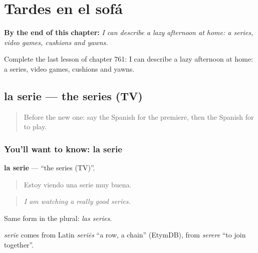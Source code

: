 
\chapter{Tardes en el sofá}
\label{ch:es-tardes-en-el-sofa}

\begin{chapteropening}
\textbf{By the end of this chapter:} \emph{I can describe a lazy afternoon at home: a series, video games, cushions and yawns.}

Complete the last lesson of chapter 761: I can describe a lazy afternoon at home: a series, video games, cushions and yawns.
\end{chapteropening}

\section[la serie]{la serie — the series (TV)}

\label{lesson:ES-C761-serie}



\begin{quote}
Before the new one: say the Spanish for the premiere, then the Spanish for to play.
\end{quote}

\subsection*{You'll want to know: la serie}
\textbf{la serie} — \textquotedblleft{}the series (TV)\textquotedblright{}.

\begin{quote}
Estoy viendo una serie muy buena.
\end{quote}

\begin{quote}
\emph{I am watching a really good series.}
\end{quote}

Same form in the plural: \emph{las series}.

\begin{cousinweb}
\emph{serie} comes from Latin \emph{seriēs} \textquotedblleft{}a row, a chain\textquotedblright{} (EtymDB), from \emph{serere} \textquotedblleft{}to join together\textquotedblright{}.
\end{cousinweb}

